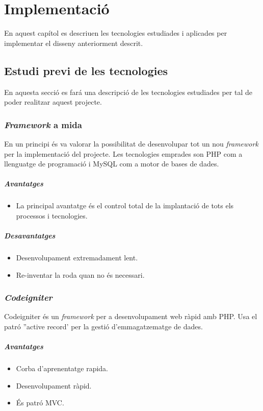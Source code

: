 \chapter{Implementaci\'{o}}
\label{cha:implementation}
En aquest capítol es descriuen les tecnologies estudiades i aplicades per implementar el disseny anteriorment descrit.

\section{Estudi previ de les tecnologies}
En aquesta secci\'{o} es far\'{a} una descripci\'{o} de les tecnologies estudiades per tal de poder realitzar aquest projecte. 

\subsection{\textit{Framework} a mida}
En un principi \'{e}s va valorar la possibilitat de desenvolupar tot un nou \textit{framework} per la implementaci\'{o} del projecte. Les tecnologies emprades son PHP com a llenguatge de programaci\'{o} i MySQL com a motor de bases de dades.
\paragraph{Avantatges}
\begin{itemize} 
\item La principal avantatge \'{e}s el control total de la implantaci\'{o} de tots els processos i tecnologies.
\end{itemize} 

\paragraph{Desavantatges}
\begin{itemize} 
\item Desenvolupament extremadament lent.
\item Re-inventar la roda quan no \'{e}s necessari.
\end{itemize} 

\subsection{\textit{Codeigniter}}
Codeigniter \'{e}s un \textit{framework} per a desenvolupament web r\`{a}pid amb PHP.\cite{codeigniter} Usa el patr\'{o} ''active record' per la gesti\'{o} d'emmagatzematge de dades.\cite{activerecord}
\paragraph{Avantatges}
\begin{itemize}
\item Corba d'aprenentatge rapida.
\item Desenvolupament r\`{a}pid.
\item \'{E}s patr\'{o} MVC.
\end{itemize}

